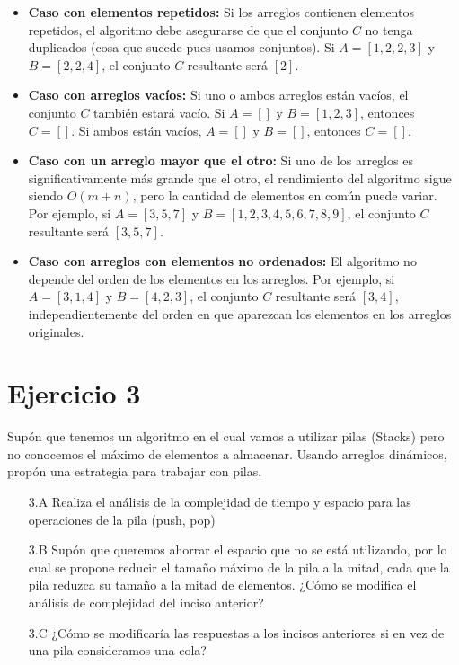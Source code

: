 \documentclass[12pt]{article}
\begin{document}
\begin{itemize}
\begin{itemize}
        \item \textbf{Caso con elementos repetidos:} Si los arreglos contienen elementos repetidos, el algoritmo debe asegurarse de que el conjunto $C$ no tenga duplicados (cosa que sucede pues usamos conjuntos). Si $A = [1, 2, 2, 3]$ y $B = [2, 2, 4]$, el conjunto $C$ resultante será $[2]$.
        \item \textbf{Caso con arreglos vacíos:} Si uno o ambos arreglos están vacíos, el conjunto $C$ también estará vacío. Si $A = []$ y $B = [1, 2, 3]$, entonces $C = []$. Si ambos están vacíos, $A = []$ y $B = []$, entonces $C = []$.
        \item \textbf{Caso con un arreglo mayor que el otro:} Si uno de los arreglos es significativamente más grande que el otro, el rendimiento del algoritmo sigue siendo $O(m + n)$, pero la cantidad de elementos en común puede variar. Por ejemplo, si $A = [3, 5, 7]$ y $B = [1, 2, 3, 4, 5, 6, 7, 8, 9]$, el conjunto $C$ resultante será $[3, 5, 7]$.
        \item \textbf{Caso con arreglos con elementos no ordenados:} El algoritmo no depende del orden de los elementos en los arreglos. Por ejemplo, si $A = [3, 1, 4]$ y $B = [4, 2, 3]$, el conjunto $C$ resultante será $[3, 4]$, independientemente del orden en que aparezcan los elementos en los arreglos originales.
    \end{itemize}
\end{itemize}

\section*{Ejercicio 3}
Supón que tenemos un algoritmo en el cual vamos a utilizar pilas (Stacks) pero no conocemos el máximo de elementos a almacenar. Usando arreglos dinámicos, propón una estrategia para trabajar con pilas.
\begin{itemize}
    \item[3.A] Realiza el análisis de la complejidad de tiempo y espacio para las operaciones de la pila (push, pop)
    \item[3.B] Supón que queremos ahorrar el espacio que no se está utilizando, por lo cual se propone reducir el tamaño máximo de la pila a la mitad, cada que la pila reduzca su tamaño a la mitad de elementos. ¿Cómo se modifica el análisis de complejidad del inciso anterior?
    \item[3.C] ¿Cómo se modificaría las respuestas a los incisos anteriores si en vez de una pila consideramos una cola?
\end{itemize}
\end{document}
